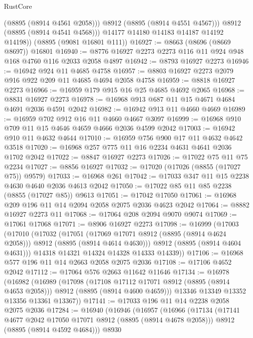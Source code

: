 \begin{lexlean}{RustCore}
\begin{coremodule}
              (@8895 (@8914 @4561 @2058)))
            @8912
            (@8895 (@8914 @4551 @4567)))
          @8912
          (@8895 (@8914 @4541 @4568)))
        @14177
        @14180
        @14183
        @14187
        @14192
        @14198))
    (@8895 (@9081 @16801 @111))
@16927 := @8663 (@8696 (@8669 @8697)) @16801
@16940 := @8776 @16927 @2273 @2273 @116 @11 @924 @948 @168 @4760 @116 @2033 @2058 @4897
@16942 := @8793 @16927 @2273
@16946 := @16942 @924 @11 @4685 @4758
@16957 := @8803 @16927 @2273 @2079 @916 @922 @209 @11 @4685 @4694 @2058 @4758
@16959 := @8818 @16927 @2273
@16966 := @16959 @179 @915 @16 @25 @4685 @4692 @2065
@16968 := @8831 @16927 @2273
@16978 := @16968 @913 @687 @11 @15 @4671 @4684 @4691 @2036 @4591 @2042
@16982 := @16942 @913 @11 @4660 @4669
@16989 := @16959 @702 @912 @16 @11 @4660 @4667 @3097
@16999 := @16968 @910 @709 @11 @15 @4646 @4659 @4666 @2036 @4599 @2042
@17003 := @16942 @910 @11 @4632 @4644
@17010 := @16959 @756 @900 @17 @11 @4632 @4642 @3518
@17020 := @16968 @257 @775 @11 @16 @2234 @4631 @4641 @2036 @1702 @2042
@17022 := @8847 @16927 @2273
@17026 := @17022 @75 @11 @75 @2234
@17027 := @8856 @16927
@17032 := @17020 (@17026 (@8855 (@17027 @75)) @9579)
@17033 := @16968 @261
@17042 := @17033 @347 @11 @15 @2238 @4630 @4640 @2036 @4613 @2042
@17050 := @17022 @85 @11 @85 @2238 (@8855 (@17027 @85)) @9613
@17051 := @17042 @17050
@17061 := @16968 @209 @196 @11 @14 @2094 @2058 @2075 @2036 @4623 @2042
@17064 := @8882 @16927 @2273 @11
@17068 := @17064 @208 @2094 @9070 @9074
@17069 := @17061 @17068
@17071 := @8906 @16927 @2273
@17098 := @16999
    (@17003
      (@17010
        (@17032
          (@17051
            (@17069 @17071 @8912 (@8895 (@8914 @4624 @2058)))
            @8912
            (@8895 (@8914 @4614 @4630)))
          @8912
          (@8895 (@8914 @4604 @4631)))
        @14318
        @14321
        @14324
        @14328
        @14333
        @14339))
@17106 := @16968 @577 @196 @11 @14 @2663 @2058 @2075 @2036
@17108 := @17106 @4652 @2042
@17112 := @17064 @576 @2663 @11642 @11646
@17134 := @16978
    (@16982
      (@16989
        (@17098
          (@17108 @17112 @17071 @8912 (@8895 (@8914 @4653 @2058)))
          @8912
          (@8895 (@8914 @4600 @4659)))
        @13346
        @13349
        @13352
        @13356
        @13361
        @13367))
@17141 := @17033 @196 @11 @14 @2238 @2058 @2075 @2036
@17284 := @16940
    (@16946
      (@16957
        (@16966
          (@17134
            (@17141 @4677 @2042 @17050 @17071 @8912 (@8895 (@8914 @4678 @2058)))
            @8912
            (@8895 (@8914 @4592 @4684)))
          @8930

\end{coremodule}
\end{lexlean}
